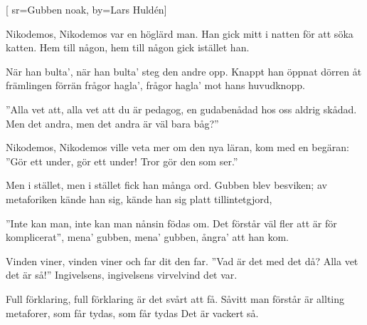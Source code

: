 
[
	sr={Gubben noak},
	by={Lars Huldén}] 

\beginverse*
Nikodemos, Nikodemos
var en höglärd man.
Han gick mitt i natten
för att söka katten.
Hem till någon, hem till någon
gick istället han.
\endverse

\beginverse*
När han bulta', när han bulta' 
steg den andre opp.
Knappt han öppnat dörren
åt främlingen förrän
frågor hagla', frågor hagla' 
mot hans huvudknopp.
\endverse

\beginverse*
''Alla vet att, alla vet att
du är pedagog,
en gudabenådad
hos oss aldrig skådad.
Men det andra, men det andra
är väl bara båg?''
\endverse

\beginverse*
Nikodemos, Nikodemos
ville veta mer
om den nya läran,
kom med en begäran:
''Gör ett under, gör ett under!
Tror gör den som ser.''
\endverse

\beginverse*
Men i stället, men i stället
fick han många ord.
Gubben blev besviken;
av metaforiken
kände han sig, kände han sig
platt tillintetgjord,
\endverse

\beginverse*
''Inte kan man, inte kan man
nånsin födas om.
Det förstår väl fler att
är för komplicerat'',
mena' gubben, mena' gubben,
ångra' att han kom.
\endverse

\beginverse*
Vinden viner, vinden viner
och far dit den far.
''Vad är det med det då?
Alla vet det är så!''
Ingivelsens, ingivelsens
virvelvind det var.
\endverse

\beginverse*
Full förklaring, full förklaring
är det svårt att få.
Såvitt man förstår är
allting metaforer,
som får tydas, som får tydas
Det är vackert så.
\endverse


\endsong
